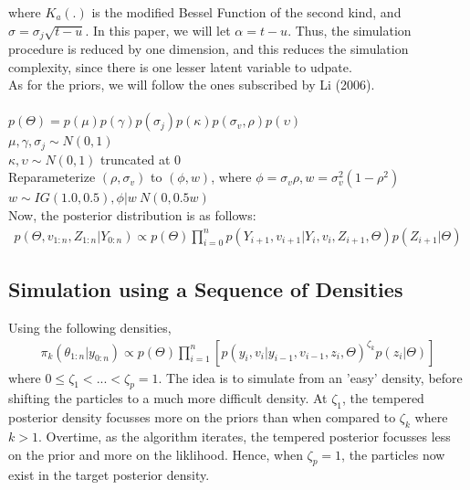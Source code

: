 \documentclass[12pt]{article}
\theoremstyle{definition}
\begin{document}
where $K_{a}(.)$ is the modified Bessel Function of the second kind, and $\sigma = \sigma_{j}\sqrt{t-u}$. In this paper, we will let $\alpha = t-u$. Thus, the simulation procedure is reduced by one dimension, and this reduces the simulation complexity, since there is one lesser latent variable to udpate. \\
As for the priors, we will follow the ones subscribed by Li (2006).\\
\\
$p(\Theta)=p(\mu)p(\gamma)p(\sigma_{j})p(\kappa)p(\sigma_v,\rho)p(\upsilon)$\\
$\mu,\gamma,\sigma_{j} \sim N(0,1)$\\
$\kappa,\upsilon \sim N(0,1)$ truncated at 0\\
Reparameterize $(\rho,\sigma_{v})$ to $(\phi,w)$, where $\phi = \sigma_{v} \rho , w = \sigma_{v}^{2}(1-\rho^{2})$\\
$w \sim IG(1.0,0.5), \phi | w ~ N(0,0.5w)$\\

\noindent Now, the posterior distribution is as follows:
\begin{equation}
\begin{aligned}
p(\Theta,v_{1:n},Z_{1:n}|Y_{0:n}) \propto p(\Theta) \prod_{i=0}^{n} p(Y_{i+1},v_{i+1}|Y_{i},v_{i},Z_{i+1},\Theta)p(Z_{i+1}|\Theta)
\end{aligned}
\end{equation}

\subsection{Simulation using a Sequence of Densities}
Using the following densities,
\begin{equation}
	\begin{aligned}
		\pi_{k}(\theta_{1:n}|y_{0:n}) \propto p(\Theta)\prod_{i=1}^{n}[p(y_{i},v_{i}|y_{i-1},v_{i-1},z_{i},\Theta)^{\zeta_{k}}p(z_{i}|\Theta)] 
	\end{aligned}
\end{equation}
where $0\leqslant\zeta_{1}<...<\zeta_{p}=1.$ 
\noindent The idea is to simulate from an 'easy' density, before shifting the particles to a much more difficult density. At $\zeta_{1}$, the tempered posterior density focusses more on the priors than when compared to $\zeta_{k}$ where $k>1$. Overtime, as the algorithm iterates, the tempered posterior focusses less on the prior and more on the liklihood. Hence, when $\zeta_{p}=1$, the particles now exist in the target posterior density.
\end{document}
